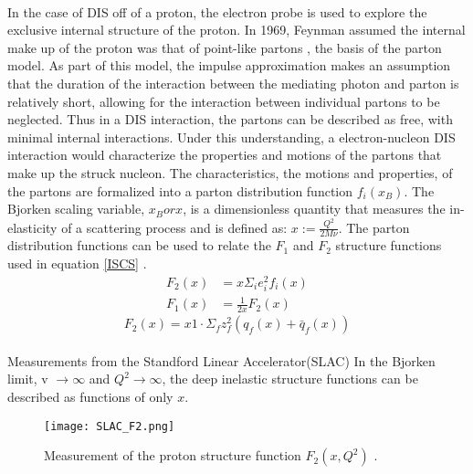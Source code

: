 \paragraph{}In the case of DIS off of a proton, the electron probe is used to explore the exclusive internal structure of the proton. In 1969, Feynman assumed the internal make up of the proton was that of point-like partons \cite{Briskin_thesis,DISproton}, the basis of the parton model. As part of this model, the impulse approximation makes an assumption that the duration of the interaction between the mediating photon and parton is relatively short, allowing for the interaction between individual partons to be neglected. Thus in a DIS interaction, the partons can be described as free, with minimal internal interactions. Under this understanding, a electron-nucleon DIS interaction would characterize the properties and motions of the partons that make up the struck nucleon\cite{DISproton}. The characteristics, the motions and properties, of the partons are formalized into a parton distribution function $f_i(x_B)$. The Bjorken scaling variable, $x_B or x$, is a dimensionless quantity that measures the in-elasticity of a scattering process and is defined as: $x := \frac{Q^2}{2M\nu}$. The parton distribution functions can be used to relate the $F_1$ and $F_2$ structure functions used in equation \ref{ISCS} \cite{PnN}. 
\begin{align}
	\label{PDFs}
	F_2(x) &= x \Sigma_i e^2_i f_i(x)\\
	F_1(x) &= \frac{1}{2x} F_2(x) \nonumber
\end{align}
\begin{equation}
\label{F2q}
F_2(x) = x1 \cdot \Sigma_f z^2_f ( q_f(x) + \bar{q}_f(x))
\end{equation}

\paragraph{} Measurements from the Standford Linear Accelerator(SLAC) 
 In the Bjorken limit, v $\rightarrow \infty$ and $Q^2 \rightarrow \infty$, the deep inelastic structure functions can be described as functions of only $x$.

\begin{figure}[H]
	\centering
	\texttt{[image: SLAC\_F2.png]} 
	\caption{ Measurement of the proton structure function $F_2(x, Q^2)$\cite{ref:rev_pp} .}
	\label{F2_fig}
\end{figure} 


